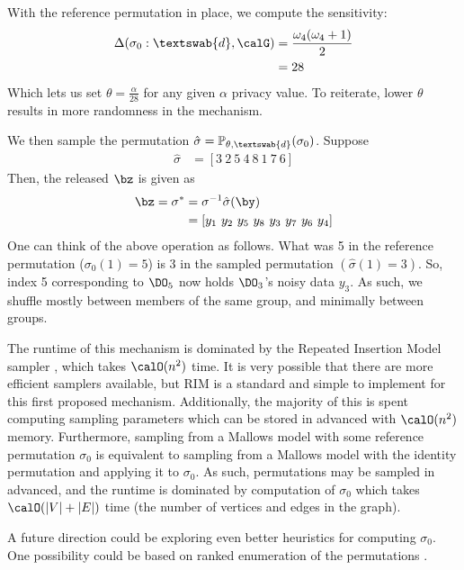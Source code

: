  With the reference permutation in place, we compute the sensitivity: 
 \begin{align*}
     \Delta(\sigma_0 : \textswab{d}, \calG)
     &= \frac{\omega_4 (\omega_4 + 1)}{2} \\
     &= 28
 \end{align*}
 Which lets us set $\theta = \frac{\alpha}{28}$ for any given $\alpha$ privacy value. To reiterate, lower $\theta$ results in more randomness in the mechanism. 
 
 We then sample the permutation $\hat{\sigma} = \mathbb{P}_{\theta, \textswab{d}}(\sigma_0)$. Suppose 
 \begin{align*}
     \hat{\sigma}
     &= [3 \ 2\ 5\ 4\ 8\ 1\ 7\ 6]
 \end{align*}
 Then, the released $\bz$ is given as 
  \begin{align*}
     \bz = \sigma^* &= \sigma^{-1} \hat{\sigma} (\by)\\
     &= [y_1 \ y_2\ y_5\ y_8\ y_3\ y_7\ y_6\ y_4]
 \end{align*}
 One can think of the above operation as follows. What was 5 in the reference permutation ($\sigma_0(1) = 5$) is 3 in the sampled permutation $(\hat{\sigma}(1) = 3)$. So, index 5 corresponding to $\DO_5$ now holds $\DO_3$'s noisy data $y_3$. As such, we shuffle mostly between members of the same group, and minimally between groups. 


 The runtime of this mechanism is dominated by the Repeated Insertion Model sampler \cite{RIM}, which takes $\calO(n^2)$ time. It is very possible that there are more efficient samplers available, but RIM is a standard and simple to implement for this first proposed mechanism. Additionally, the majority of this is spent computing sampling parameters which can be stored in advanced with $\calO(n^2)$ memory. Furthermore, sampling from a Mallows model with some reference permutation $\sigma_0$ is equivalent to sampling from a Mallows model with the identity permutation and applying it to $\sigma_0$. As such, permutations may be sampled in advanced, and the runtime is dominated by computation of $\sigma_0$ which takes $\calO(|V| + |E|)$ time (the number of vertices and edges in the graph). 
 
 A future direction could be exploring even better heuristics for computing $\sigma_0$. One possibility could be based on ranked enumeration of the permutations \cite{deep2021ranked,deep2021enumeration}.
